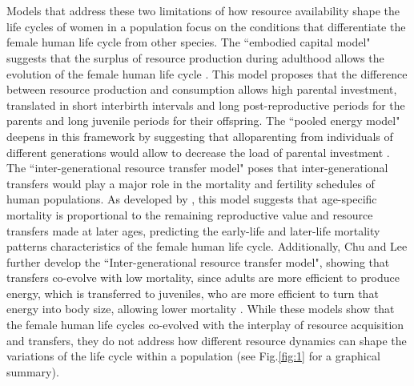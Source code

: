 \documentclass{article}
\begin{document}
\\\\
Models that address these two limitations of how resource availability shape the life cycles of women in a population focus on the conditions that differentiate the female human life cycle from other species. The ``embodied capital model" suggests that the surplus of resource production during adulthood allows the evolution of the female human life cycle \citep{kaplan2000theory}. This model proposes that the difference between resource production and consumption allows high parental investment, translated in short interbirth intervals and long post-reproductive periods for the parents and long juvenile periods for their offspring. The ``pooled energy model" deepens in this framework by suggesting that alloparenting from individuals of different generations would allow to decrease the load of parental investment \citep{kramer2010pooled}. The ``inter-generational resource transfer model" poses that inter-generational transfers would play a major role in the mortality and fertility schedules of human populations. As developed by \cite{lee2003rethinking}, this model suggests that age-specific mortality is proportional to the remaining reproductive value and resource transfers made at later ages, predicting the early-life and later-life mortality patterns characteristics of the female human life cycle. Additionally, Chu and Lee further develop the ``Inter-generational resource transfer model", showing that transfers co-evolve with low mortality, since adults are more efficient to produce energy, which is transferred to juveniles, who are more efficient to turn that energy into body size, allowing lower mortality \citep{chu2006co}. While these models show that the female human life cycles co-evolved with the interplay of resource acquisition and transfers, they do not address how different resource dynamics can shape the variations of the life cycle within a population (see Fig.\ref{fig:1} for a graphical summary).
\\\\
\end{document}
